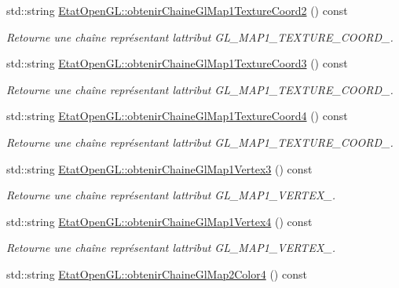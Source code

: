 \begin{DoxyCompactItemize}
std\+::string \hyperlink{group__utilitaire_gade175aafd1123e597959f78fbe04489f}{Etat\+Open\+G\+L\+::obtenir\+Chaine\+Gl\+Map1\+Texture\+Coord2} () const 
\begin{DoxyCompactList}\small\item\em Retourne une chaîne représentant l\textquotesingle{}attribut G\+L\+\_\+\+M\+A\+P1\+\_\+\+T\+E\+X\+T\+U\+R\+E\+\_\+\+C\+O\+O\+R\+D\+\_. \end{DoxyCompactList}\item 
std\+::string \hyperlink{group__utilitaire_ga6690ab58fbdae84d2543e29cc9e4c41d}{Etat\+Open\+G\+L\+::obtenir\+Chaine\+Gl\+Map1\+Texture\+Coord3} () const 
\begin{DoxyCompactList}\small\item\em Retourne une chaîne représentant l\textquotesingle{}attribut G\+L\+\_\+\+M\+A\+P1\+\_\+\+T\+E\+X\+T\+U\+R\+E\+\_\+\+C\+O\+O\+R\+D\+\_. \end{DoxyCompactList}\item 
std\+::string \hyperlink{group__utilitaire_gab7a65aa462c3a278c42977ed9a35904e}{Etat\+Open\+G\+L\+::obtenir\+Chaine\+Gl\+Map1\+Texture\+Coord4} () const 
\begin{DoxyCompactList}\small\item\em Retourne une chaîne représentant l\textquotesingle{}attribut G\+L\+\_\+\+M\+A\+P1\+\_\+\+T\+E\+X\+T\+U\+R\+E\+\_\+\+C\+O\+O\+R\+D\+\_. \end{DoxyCompactList}\item 
std\+::string \hyperlink{group__utilitaire_gafe0e07682a0bb42bb227fecd287de609}{Etat\+Open\+G\+L\+::obtenir\+Chaine\+Gl\+Map1\+Vertex3} () const 
\begin{DoxyCompactList}\small\item\em Retourne une chaîne représentant l\textquotesingle{}attribut G\+L\+\_\+\+M\+A\+P1\+\_\+\+V\+E\+R\+T\+E\+X\+\_. \end{DoxyCompactList}\item 
std\+::string \hyperlink{group__utilitaire_gab130a35770d4594bf74a89d18c49697a}{Etat\+Open\+G\+L\+::obtenir\+Chaine\+Gl\+Map1\+Vertex4} () const 
\begin{DoxyCompactList}\small\item\em Retourne une chaîne représentant l\textquotesingle{}attribut G\+L\+\_\+\+M\+A\+P1\+\_\+\+V\+E\+R\+T\+E\+X\+\_. \end{DoxyCompactList}\item 
std\+::string \hyperlink{group__utilitaire_ga85dca50f7d25944ca4158173a630d15d}{Etat\+Open\+G\+L\+::obtenir\+Chaine\+Gl\+Map2\+Color4} () const 

\end{DoxyCompactItemize}
